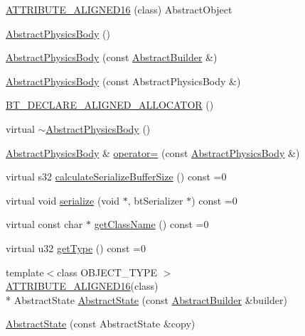 \begin{DoxyCompactItemize}
\item 
\hyperlink{namespacejli_a5cb9f42798ccca4b6de51fe827ade095}{A\+T\+T\+R\+I\+B\+U\+T\+E\+\_\+\+A\+L\+I\+G\+N\+E\+D16} (class) Abstract\+Object
\item 
\hyperlink{namespacejli_a4eb9a23f0614497a7922d323a49cb822}{Abstract\+Physics\+Body} ()
\item 
\hyperlink{namespacejli_ad1a3c0146786fe6995fb9696c653555f}{Abstract\+Physics\+Body} (const \hyperlink{classjli_1_1_abstract_builder}{Abstract\+Builder} \&)
\item 
\hyperlink{namespacejli_a42235253cee125ef6fe3f35d61cb6a12}{Abstract\+Physics\+Body} (const Abstract\+Physics\+Body \&)
\item 
\hyperlink{namespacejli_a570a0b81268f888f69ad4c8b7fe6edae}{B\+T\+\_\+\+D\+E\+C\+L\+A\+R\+E\+\_\+\+A\+L\+I\+G\+N\+E\+D\+\_\+\+A\+L\+L\+O\+C\+A\+T\+O\+R} ()
\item 
virtual \hyperlink{namespacejli_aacaf3d149e42af3ba68c1225ccbe6797}{$\sim$\+Abstract\+Physics\+Body} ()
\item 
\hyperlink{namespacejli_a4eb9a23f0614497a7922d323a49cb822}{Abstract\+Physics\+Body} \& \hyperlink{namespacejli_abf374f753c2ae3833479fc522c07b7a9}{operator=} (const \hyperlink{namespacejli_a4eb9a23f0614497a7922d323a49cb822}{Abstract\+Physics\+Body} \&)
\item 
virtual s32 \hyperlink{namespacejli_a643ba9aff12ba46ade9719f4d8c08303}{calculate\+Serialize\+Buffer\+Size} () const =0
\item 
virtual void \hyperlink{namespacejli_aa823f0f9cca7324a986925864ae004f6}{serialize} (void $\ast$, bt\+Serializer $\ast$) const =0
\item 
virtual const char $\ast$ \hyperlink{namespacejli_a0fd7c3459b7eb61032050c78a9d48d65}{get\+Class\+Name} () const =0
\item 
virtual u32 \hyperlink{namespacejli_ab742f1c07eed63b74053aa01c3193d1f}{get\+Type} () const =0
\item 
{\footnotesize template$<$class O\+B\+J\+E\+C\+T\+\_\+\+T\+Y\+P\+E $>$ }\\\hyperlink{namespacejli_a5cb9f42798ccca4b6de51fe827ade095}{A\+T\+T\+R\+I\+B\+U\+T\+E\+\_\+\+A\+L\+I\+G\+N\+E\+D16}(class) \\*
Abstract\+State \hyperlink{namespacejli_afb90c6843a57abb6648df522fd034666}{Abstract\+State} (const \hyperlink{classjli_1_1_abstract_builder}{Abstract\+Builder} \&builder)
\item 
\hyperlink{namespacejli_ac1726cb5b995ec49ba12eea96abfc7b2}{Abstract\+State} (const Abstract\+State \&copy)

\end{DoxyCompactItemize}
